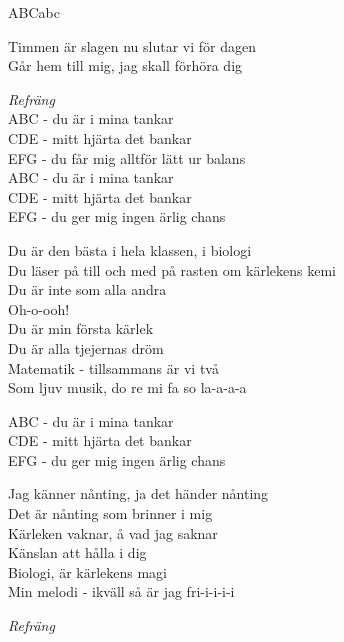 \begin{song}{ABC}{abc}
\begin{vers}
Timmen är slagen nu slutar vi för dagen\\
Går hem till mig, jag skall förhöra dig\\
\end{vers}
\begin{vers}
\textit{Refräng}\\
ABC - du är i mina tankar\\
CDE - mitt hjärta det bankar\\
EFG - du får mig alltför lätt ur balans\\
ABC - du är i mina tankar\\
CDE - mitt hjärta det bankar\\
EFG - du ger mig ingen ärlig chans\\
\end{vers}
\begin{vers}
Du är den bästa i hela klassen, i biologi\\
Du läser på till och med på rasten om kärlekens kemi\\
Du är inte som alla andra\\
Oh-o-ooh!\\
Du är min första kärlek\\
Du är alla tjejernas dröm\\
Matematik - tillsammans är vi två\\
Som ljuv musik, do re mi fa so la-a-a-a\\
\end{vers}
\begin{vers}
ABC - du är i mina tankar\\
CDE - mitt hjärta det bankar\\
EFG - du ger mig ingen ärlig chans\\
\end{vers}
\begin{vers}
Jag känner nånting, ja det händer nånting\\
Det är nånting som brinner i mig\\
Kärleken vaknar, å vad jag saknar\\
Känslan att hålla i dig\\
Biologi, är kärlekens magi\\
Min melodi - ikväll så är jag fri-i-i-i-i\\
\end{vers}
\begin{vers}
\textit{Refräng}\\
\end{vers}
\end{song}
